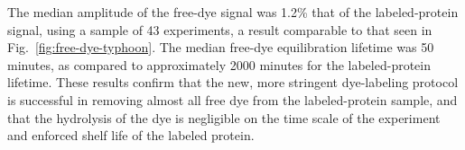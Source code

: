 The median amplitude of the free-dye signal was 1.2\% that of the labeled-protein signal, using a sample of 43 experiments, a result comparable to that seen in Fig.~\ref{fig:free-dye-typhoon}.  The median free-dye equilibration lifetime was 50 minutes, as compared to approximately 2000 minutes for the labeled-protein lifetime.  These results confirm that the new, more stringent dye-labeling protocol is successful in removing almost all free dye from the labeled-protein sample, and that the hydrolysis of the dye is negligible on the time scale of the experiment and enforced shelf life of the labeled protein.


